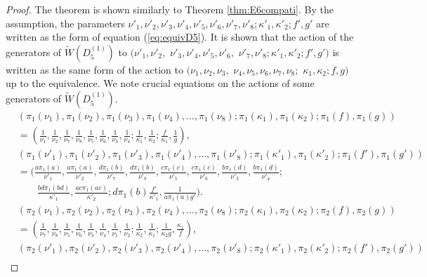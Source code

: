 \documentclass[12pt]{amsart}
\numberwithin{equation}{section}
\theoremstyle{definition}
\begin{document}
\begin{proof}
The theorem is shown similarly to Theorem \ref{thm:E6compati}.
By the assumption, the parameters $ \nu '_1 , \nu '_2 , \nu '_3 , \nu '_4 ,\nu '_5 ,\nu '_6 , \nu '_7 ,\nu '_8 ; \kappa '_1 ,\kappa '_2 ; f' ,g' $ are written as the form of equation (\ref{eq:equivD5}).
It is shown that the action of the generators of $\widetilde{W}(D^{(1)}_{5})$ to $(\nu '_1 , \nu '_2 ,$ $ \nu '_3 , \nu '_4 ,\nu '_5 ,\nu '_6 ,$ $ \nu '_7 ,\nu '_8 ; \kappa '_1 ,\kappa '_2 ; f' ,g' ) $ is written as the same form of the action to $(\nu _1 , \nu _2 , \nu _3 ,$ $ \nu _4 ,\nu _5 ,\nu _6 , \nu _7 ,\nu _8 ;$ $ \kappa _1 ,\kappa _2 ; f ,g ) $ up to the equivalence.
We note crucial equations on the actions of some generators of $\widetilde{W}(D^{(1)}_{5})$.
\begin{align}
  & ( \pi _1 (\nu_1), \pi _1 (\nu_2), \pi _1 (\nu_3), \pi _1 (\nu_4), \dots , \pi _1 (\nu_8); \pi _1 (\kappa_1), \pi _1 (\kappa_2); \pi _1 (f), \pi _1 (g) )\\  & = ( \frac{1}{\nu_1},  \frac{1}{\nu_2},  \frac{1}{\nu_7},  \frac{1}{\nu_8}, \frac{1}{\nu_5}, \frac{1}{\nu_6}, \frac{1}{\nu_3}, \frac{1}{\nu_4} ; \frac{1}{\kappa_1},  \frac{1}{\kappa_2}; \frac{f}{\kappa_1},  \frac{1}{g} ), \nonumber \\
  & ( \pi _1 (\nu'_1), \pi _1 (\nu'_2), \pi _1 (\nu'_3), \pi _1 (\nu'_4),  \dots ,  \pi _1 (\nu'_8);\pi _1 (\kappa'_1), \pi _1 (\kappa'_2); \pi _1 (f'), \pi _1 (g') ) \nonumber \\
  & = ( \frac{a \pi _1 (a) }{\nu'_1}, \frac{a \pi _1 (a) }{\nu'_2}, \frac{d \pi _1 (b) }{\nu'_7}, \frac{d \pi _1 (b) }{\nu'_8}, \frac{c \pi _1 (c) }{\nu'_5}, \frac{c \pi _1 (c) }{\nu'_6}, \frac{b \pi _1 (d) }{\nu'_3}, \frac{b \pi _1 (d) }{\nu'_4} ; \nonumber \\
  &  \qquad \frac{bd \pi _1 (bd) }{\kappa'_1}, \frac{ac \pi _1 (ac) }{\kappa'_2}; d \pi _1 (b) \frac{f'}{\kappa'_1}, \frac{1}{a \pi _1 (a)g'}) . \nonumber
\end{align}
\begin{align}
  & ( \pi _2 (\nu_1), \pi _2 (\nu_2), \pi _2 (\nu_3), \pi _2 (\nu_4),  \dots ,  \pi _2 (\nu_8); \pi _2 (\kappa_1), \pi _2 (\kappa_2); \pi _2 (f), \pi _2 (g) )\\
  & = (  \frac{1}{\nu_7},  \frac{1}{\nu_8},  \frac{1}{\nu_5},  \frac{1}{\nu_6},  \frac{1}{\nu_3},  \frac{1}{\nu_4},  \frac{1}{\nu_1}, \frac{1}{\nu_2} ; \frac{1}{\kappa_2}, \frac{1}{\kappa_1}; \frac{1}{\kappa_2 g}, \frac{\kappa_1}{f} ), \nonumber \\
  & ( \pi _2 (\nu'_1), \pi _2 (\nu'_2), \pi _2 (\nu'_3), \pi _2 (\nu'_4),  \dots ,  \pi _2 (\nu'_8);\pi _2 (\kappa'_1), \pi _2 (\kappa'_2); \pi _2 (f'), \pi _2 (g') ) \nonumber \\

\end{align}
\end{proof}
\end{document}
